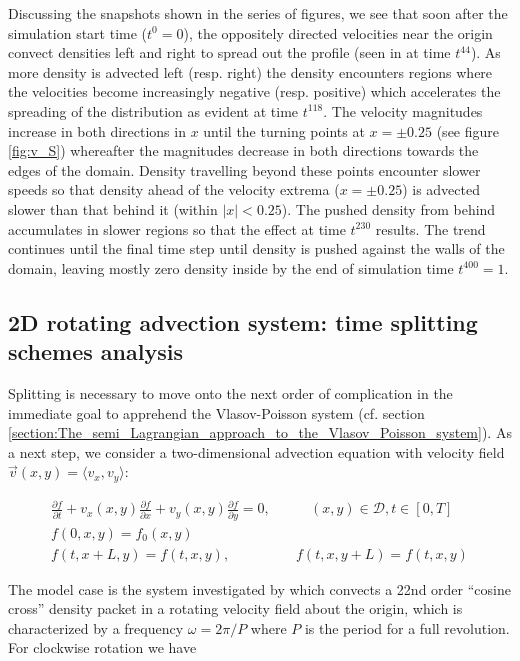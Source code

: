 \documentclass[11pt,titlepage]{report}
\begin{document}
Discussing the snapshots shown in the series of figures, we see that soon after the simulation start time ($t^0 = 0$), the oppositely directed velocities near the origin convect densities left and right to spread out the profile (seen in at time $t^{44}$). As more density is advected left (resp. right) the density encounters regions where the velocities become increasingly negative (resp. positive) which accelerates the spreading of the distribution as evident at time $t^{118}$. The velocity magnitudes increase in both directions in $x$ until the turning points at $x = \pm 0.25$ (see figure \ref{fig:v_S}) whereafter the magnitudes decrease in both directions towards the edges of the domain. Density travelling beyond these points encounter slower speeds so that density ahead of the velocity extrema ($x = \pm 0.25$) is advected slower than that behind it (within $|x| < 0.25$). The pushed density from behind accumulates in slower regions so that the effect at time $t^{230}$ results. The trend continues until the final time step until density is pushed against the walls of the domain, leaving mostly zero density inside by the end of simulation time $t^{400} = 1$.


\subsection{2D rotating advection system: time splitting schemes analysis}\label{sec:2D_rot_advection}

\indent \indent Splitting is necessary to move onto the next order of complication in the immediate goal to apprehend the Vlasov-Poisson system (cf. section \ref{section:The_semi_Lagrangian_approach_to_the_Vlasov_Poisson_system}). As a next step, we consider a two-dimensional advection equation with velocity field $\vec{v}(x,y) = \langle v_x,v_y \rangle$:

\begin{subequations}
\label{eq:Advec_eq_1D_unit_vel}
\begin{align}
\frac{\partial f}{\partial t} + v_x(x,y)\frac{\partial f}{\partial x} + v_y(x,y)\frac{\partial f}{\partial y} =  0, &\qquad (x,y)\in\mathcal{D}, t\in [0,T] \label{eq:2D_advec_equation_general}\\[1em]
f(0,x,y) = f_0(x,y) \\[1em]
f(t,x + L,y) = f(t,x,y), & \quad f(t,x,y+L) = f(t,x,y)
\end{align}
\end{subequations}

The model case is the system investigated by \cite{Guclu14} which convects a 22nd order ``cosine cross'' density packet in a rotating velocity field about the origin, which is characterized by a frequency $\omega = 2\pi / P$ where $P$ is the period for a full revolution. For clockwise rotation we have
\end{document}
